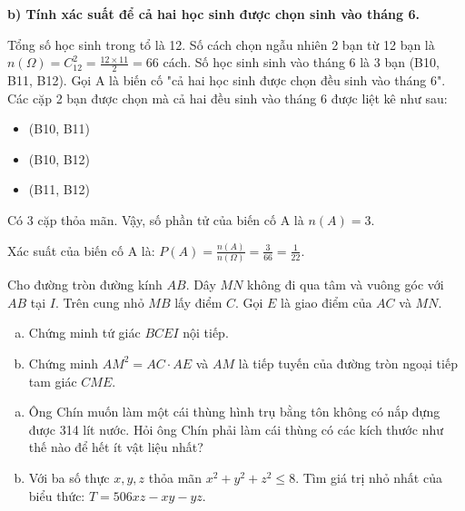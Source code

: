 \begin{ex}
{		\textbf{b) Tính xác suất để cả hai học sinh được chọn sinh vào tháng 6.}
		
		Tổng số học sinh trong tổ là 12.
		Số cách chọn ngẫu nhiên 2 bạn từ 12 bạn là $n(\Omega) = C_{12}^2 = \frac{12 \times 11}{2} = 66$ cách.
		Số học sinh sinh vào tháng 6 là 3 bạn (B10, B11, B12).
		Gọi A là biến cố "cả hai học sinh được chọn đều sinh vào tháng 6".
		Các cặp 2 bạn được chọn mà cả hai đều sinh vào tháng 6 được liệt kê như sau:
		\begin{itemize}
			\item (B10, B11)
			\item (B10, B12)
			\item (B11, B12)
		\end{itemize}
		Có 3 cặp thỏa mãn. Vậy, số phần tử của biến cố A là $n(A) = 3$.
		
		Xác suất của biến cố A là:
		$P(A) = \frac{n(A)}{n(\Omega)} = \frac{3}{66} = \frac{1}{22}$.
	}
\end{ex}
\begin{ex} %
	Cho đường tròn đường kính $AB$. Dây $MN$ không đi qua tâm và vuông góc với $AB$ tại $I$. Trên cung nhỏ $MB$ lấy điểm $C$. Gọi $E$ là giao điểm của $AC$ và $MN$.
	\begin{enumerate}[a)]
		\item Chứng minh tứ giác $BCEI$ nội tiếp.
		\item Chứng minh $AM^2 = AC \cdot AE$ và $AM$ là tiếp tuyến của đường tròn ngoại tiếp tam giác $CME$.
	\end{enumerate}
	\loigiai{}
\end{ex}

\begin{ex} %
	\begin{enumerate}[a)]
		\item Ông Chín muốn làm một cái thùng hình trụ bằng tôn không có nắp đựng được 314 lít nước. Hỏi ông Chín phải làm cái thùng có các kích thước như thế nào để hết ít vật liệu nhất?
		\item Với ba số thực $x, y, z$ thỏa mãn $x^2+y^2+z^2 \le 8$.
		Tìm giá trị nhỏ nhất của biểu thức: $T = 506xz - xy - yz$.
	\end{enumerate}
	\loigiai{}
\end{ex}

